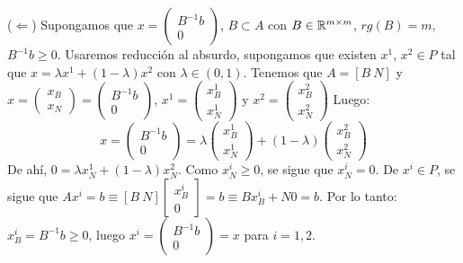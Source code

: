 \documentclass[PM.tex]{subfiles}
\begin{document}
\begin{dem}
($\Leftarrow$) Supongamos que $x =\begin{pmatrix} B^{-1}b\\0\end{pmatrix}$, $B \subset A$ con $B \in \mathbb{R}^{m \times m}$, $rg(B)=m$, $B^{-1}b ≥ 0$. Usaremos reducción al absurdo, supongamos que existen $x^1$, $x^2 \in P$ tal que $x = λx^1+(1-λ)x^2$ con $λ \in (0,1)$. Tenemos que $A = [B\ N]$ y $x = \begin{pmatrix}x_B\\x_N\end{pmatrix} = \begin{pmatrix} B^{-1}b\\0\end{pmatrix}$, $x^1 = \begin{pmatrix}x_B^1\\x_N^1\end{pmatrix}$ y $x^2 = \begin{pmatrix}x_B^2\\x_N^2\end{pmatrix}$ Luego:
\[ x = \begin{pmatrix} B^{-1}b\\0\end{pmatrix} = λ\begin{pmatrix}x_B^1\\x_N^1\end{pmatrix}+(1-λ)\begin{pmatrix}x_B^2\\x_N^2\end{pmatrix} \]
De ahí, $0 = λ x_N^1 + (1-λ) x_N^2$. Como $x_N^i ≥ 0$, se sigue que $x_N^i = 0$. De $x^i \in P$, se sigue que $Ax^i = b \equiv [B\ N]\begin{bmatrix}x_B^i\\0
\end{bmatrix} = b \equiv Bx_B^i + N0 = b$. Por lo tanto: $x_B^i = B^{-1}b \geq 0$, luego $x^i = \begin{pmatrix}B^{-1}b\\0\end{pmatrix}=x$ para $i=1,2$.



\end{dem}
\end{document}
